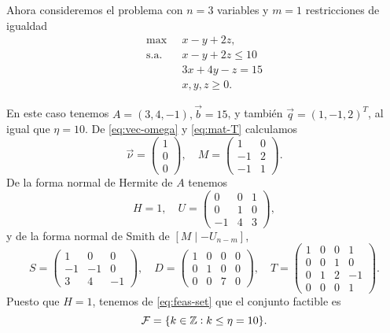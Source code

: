\begin{example}
	\label{ex:three-var}
	Ahora consideremos el problema con $n = 3$ variables y $m = 1$ restricciones de igualdad
	\begin{align*}
		\max
			~& x - y + 2z, \\
		\text{s.a.} \quad
			& x - y  + 2z \leq 10 \\
			& 3x + 4y - z = 15 \\
			& x, y, z \geq 0.
	\end{align*}

	En este caso tenemos $A = (3, 4, -1), \vec{b} = 15$, y también $\vec{q} = (1, -1, 2)^T$, al igual que
	$\eta = 10$. De \eqref{eq:vec-omega} y \eqref{eq:mat-T} calculamos
	\begin{equation*}
		\vec{\nu} = \begin{pmatrix} 1 \\ 0 \\ 0 \end{pmatrix},\quad
		M = \begin{pmatrix} 1 & 0 \\ -1 & 2 \\ -1 & 1 \end{pmatrix}.
	\end{equation*}
	De la forma normal de Hermite de $A$ tenemos
	\begin{equation*}
		H = 1,\quad U = \begin{pmatrix} 0 & 0 & 1 \\ 0 & 1 & 0 \\ -1 & 4 & 3 \end{pmatrix},
	\end{equation*}
	y de la forma normal de Smith de $[M \mid -U_{n-m}]$,
	\begin{equation*}
		S = \begin{pmatrix}
			1 & 0 & 0 \\
			-1 & -1 & 0 \\
			3 & 4 & -1
		\end{pmatrix},\quad
		D = \begin{pmatrix}
			1 & 0 & 0 & 0 \\
			0 & 1 & 0 & 0 \\
			0 & 0 & 7 & 0
		\end{pmatrix},\quad
		T = \begin{pmatrix}
			1 & 0 & 0 & 1 \\
			0 & 0 & 1 & 0 \\
			0 & 1 & 2 & -1 \\
			0 & 0 & 0 & 1
		\end{pmatrix}.
	\end{equation*}
	Puesto que $H = 1$, tenemos de \eqref{eq:feas-set} que el conjunto factible es
	\begin{equation*}
		\mathcal{F} = \lbrace k \in \mathbb{Z} \vcentcolon k \leq \eta = 10 \rbrace.
	\end{equation*}


\end{example}
